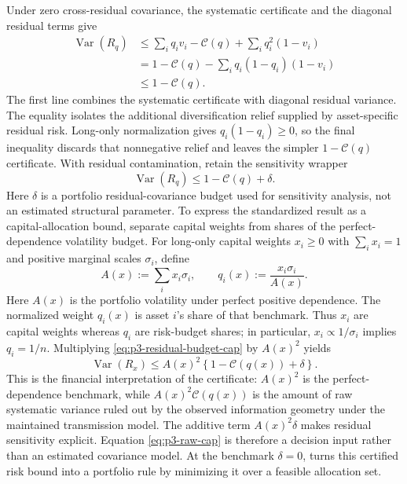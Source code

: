 Under zero cross-residual covariance, the systematic certificate and the
diagonal residual terms give
\begin{equation}\label{eq:p3-standardized-cap}
  \begin{aligned}
    \operatorname{Var}(R_q)
    &\le \sum_i q_i v_i-\mathcal C(q)
    +\sum_i q_i^2(1-v_i)\\
    &=1-\mathcal C(q)-\sum_i q_i(1-q_i)(1-v_i)\\
    &\le 1-\mathcal C(q).
  \end{aligned}
\end{equation}
The first line combines the systematic certificate with diagonal residual
variance.
The equality isolates the additional diversification relief supplied by
asset-specific residual risk.
Long-only normalization gives $q_i(1-q_i)\ge0$, so the final inequality
discards that nonnegative relief and leaves the simpler
$1-\mathcal C(q)$ certificate.
With residual contamination, retain the sensitivity wrapper
\begin{equation}\label{eq:p3-residual-budget-cap}
  \operatorname{Var}(R_q)\le1-\mathcal C(q)+\delta.
\end{equation}
Here $\delta$ is a portfolio residual-covariance budget used for sensitivity
analysis, not an estimated structural parameter.
To express the standardized result as a capital-allocation bound, separate
capital weights from shares of the perfect-dependence volatility budget.
For long-only capital weights $x_i\ge0$ with $\sum_i x_i=1$ and positive
marginal scales $\sigma_i$, define
\begin{equation}\label{eq:p3-risk-weights}
  A(x):=\sum_i x_i\sigma_i,
  \qquad
  q_i(x):=\frac{x_i\sigma_i}{A(x)}.
\end{equation}
Here $A(x)$ is the portfolio volatility under perfect positive dependence.
The normalized weight $q_i(x)$ is asset $i$'s share of that benchmark.
Thus $x_i$ are capital weights whereas $q_i$ are risk-budget shares; in
particular, $x_i\propto1/\sigma_i$ implies $q_i=1/n$.
Multiplying \eqref{eq:p3-residual-budget-cap} by $A(x)^2$ yields
\begin{equation}\label{eq:p3-raw-cap}
  \operatorname{Var}(R_x)
  \le
  A(x)^2\left\{1-\mathcal C(q(x))+\delta\right\}.
\end{equation}
This is the financial interpretation of the certificate:
$A(x)^2$ is the perfect-dependence benchmark, while
$A(x)^2\mathcal C(q(x))$ is the amount of raw systematic variance
ruled out by the
observed information geometry under the maintained transmission model.
The additive term $A(x)^2\delta$ makes residual sensitivity explicit.
Equation \eqref{eq:p3-raw-cap} is therefore a decision input rather than an
estimated covariance model.
At the benchmark $\delta=0$,  turns this certified
risk bound into a portfolio rule by minimizing it over a feasible allocation
set.
